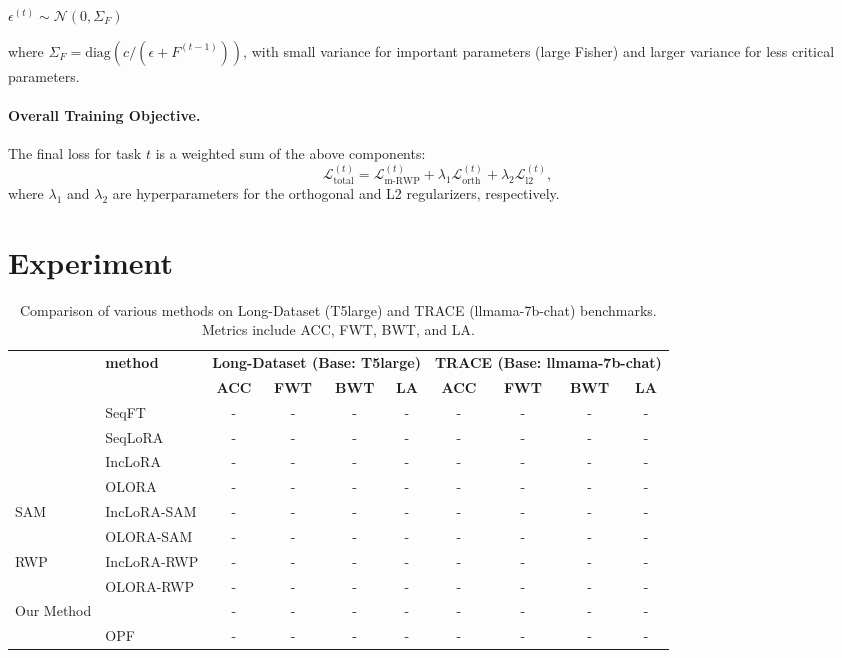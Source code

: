 \documentclass[letterpaper]{article} %
\begin{document}
$\epsilon^{(t)} \sim \mathcal{N}(0, \Sigma_F)$

where $\Sigma_F = \text{diag}(c / (\epsilon + F^{(t-1)}))$,
 with small variance for important parameters (large Fisher) and larger variance for less critical parameters.

\paragraph{Overall Training Objective.}
The final loss for task $t$ is a weighted sum of the above components:
\begin{equation}
\label{eq:full_loss}
\mathcal{L}_{\text{total}}^{(t)} = \mathcal{L}_{\mathrm{m\text{-}RWP}}^{(t)} + \lambda_1 \mathcal{L}_{\text{orth}}^{(t)} + \lambda_2 \mathcal{L}_{\text{l2}}^{(t)},
\end{equation}
where $\lambda_1$ and $\lambda_2$ are hyperparameters for the orthogonal and L2 regularizers, respectively.








\section{Experiment}


\begin{table}[thbp]
\centering
\begin{tabular}{llcccccccc}
\toprule
 & \multirow{2}{*}{\textbf{method}} 
    & \multicolumn{4}{c}{\textbf{Long-Dataset (Base: T5large)}} 
    & \multicolumn{4}{c}{\textbf{TRACE (Base: llmama-7b-chat)}} \\
\cmidrule(lr){3-6} \cmidrule(lr){7-10}
 & & \textbf{ACC} & \textbf{FWT} & \textbf{BWT} & \textbf{LA}
   & \textbf{ACC} & \textbf{FWT} & \textbf{BWT} & \textbf{LA} \\
\midrule
\multirow{4}{*}{} 
    & SeqFT       & - & - & - & - & - & - & - & - \\
    & SeqLoRA     & - & - & - & - & - & - & - & - \\
    & IncLoRA     & - & - & - & - & - & - & - & - \\
    & OLORA       & - & - & - & - & - & - & - & - \\
\midrule
\multirow{2}{*}{SAM} 
    & IncLoRA-SAM & - & - & - & - & - & - & - & - \\
    & OLORA-SAM   & - & - & - & - & - & - & - & - \\
\midrule
\multirow{2}{*}{RWP} 
    & IncLoRA-RWP & - & - & - & - & - & - & - & - \\
    & OLORA-RWP   & - & - & - & - & - & - & - & - \\
\midrule
\multirow{2}{*}{Our Method} 
    &             & - & - & - & - & - & - & - & - \\
    & OPF         & - & - & - & - & - & - & - & - \\
\bottomrule
\end{tabular}
\caption{Comparison of various methods on Long-Dataset (T5large) and TRACE (llmama-7b-chat) benchmarks. Metrics include ACC, FWT, BWT, and LA.}
\label{tab:main_cl_benchmark}
\end{table}
\end{document}
